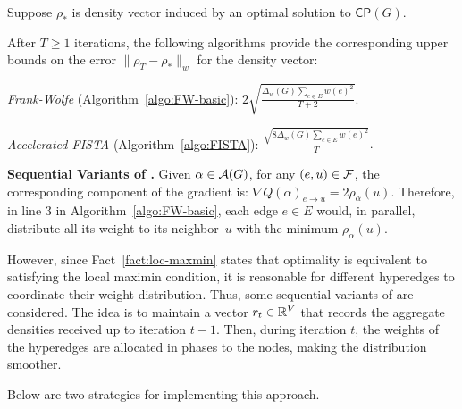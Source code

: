 \begin{fact}
	\label{cor:abs_error}
	Suppose $\rho_*$ is density vector induced
	by an optimal solution to $\mathsf{CP}(G)$.
	
	After $T \geq 1$ iterations, the following algorithms provide the corresponding upper bounds on the error $\|\rho_T - \rho_*\|_w$ for the density vector:
	
		
	\begin{compactitem}
		
		\item \emph{Frank-Wolfe} (Algorithm~\ref{algo:FW-basic}):
		$2\sqrt{\frac{\Delta_w(G) \sum_{e \in E} w(e)^2}{T+2}}.$
		
		
		
		\item \emph{Accelerated FISTA} (Algorithm~\ref{algo:FISTA}):
		$\frac{\sqrt{8 \Delta_w(G) \sum_{e \in E} w(e)^2 }}{T}.$
	\end{compactitem}
\end{fact}



\noindent \textbf{Sequential Variants of \fw.}
Given $\alpha \in \mathcal {A}(G)$, for any $(e, u) \in \mathcal {F}$, the corresponding 
component of the gradient is: $\nabla Q(\alpha)_{e \to u} = 2 \rho_\alpha(u)$. Therefore, in line 3 in Algorithm~\ref{algo:FW-basic}, each edge $e \in E$ would, in parallel, distribute all its weight to its neighbor~$u$ with the minimum $\rho_\alpha(u)$. 

However, since Fact~\ref{fact:loc-maxmin}
states that optimality is equivalent to satisfying the local maximin condition, it is reasonable for different hyperedges to coordinate their weight distribution. 
Thus, some sequential variants of \fw are considered. The idea is to maintain a vector $r_{t} \in \mathbb{R}^V$ that records the aggregate densities received up to iteration $t-1$. Then, during iteration $t$, the weights of the hyperedges are allocated in phases to the nodes, making the distribution smoother.

Below are two strategies for implementing this approach.



